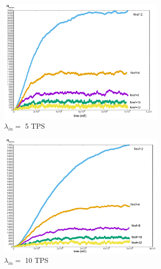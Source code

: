 \documentclass[a4paper,10pt,twocolumn]{article}
\begin{document}
\begin{appendices}
	 \space{1cm}
	
	 \begin{figure}[H]
		\begin{center}
		\includegraphics[width=80mm]{5sec.png}
		  \caption{$\lambda_{in}=$ 5 TPS}
		\label{fig:sec5}
		\end{center}
	 \end{figure}
	
	 \begin{figure}[H]
		\begin{center}
		\includegraphics[width=80mm]{10sec.png}
		  \caption{$\lambda_{in}=$ 10 TPS}
		\label{fig:sec10}
		\end{center}
	 \end{figure}
	\end{appendices}
	
\end{document}

